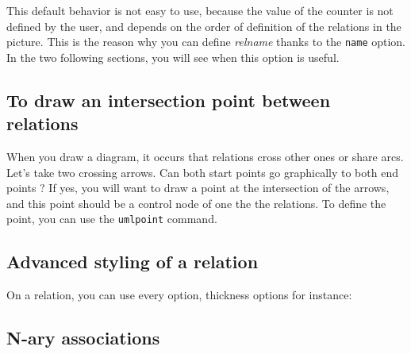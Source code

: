 \documentclass[a4paper,11pt]{report}
\begin{document}
This default behavior is not easy to use, because the value of the counter is not defined by the user, and depends on the order of definition of the relations in the picture. This is the reason why you can define {\it relname} thanks to the {\tt name} option. In the two following sections, you will see when this option is useful.

\subsection{To draw an intersection point between relations}\label{ss.relpt}

When you draw a diagram, it occurs that relations cross other ones or share arcs. Let's take two crossing arrows.
Can both start points go graphically to both end points ? If yes, you will want to draw a point at the intersection of the arrows, and this point should be a control node of one the the relations. To define the point, you can use the {\tt umlpoint} command.

\medskip

\begin{minipage}{0.5\textwidth}

\end{minipage}
\begin{minipage}{0.4\textwidth}
\begin{center}
\end{center}
\end{minipage}

\medskip

\subsection{Advanced styling of a relation}\label{ss.reladvstyle}

On a relation, you can use every \TikZ option, thickness options for instance:

\medskip

\begin{minipage}{0.5\textwidth}

\end{minipage}
\begin{minipage}{0.4\textwidth}
\begin{center}
\end{center}
\end{minipage}

\medskip

\subsection{N-ary associations}\label{ss.naryassoc}
\end{document}
